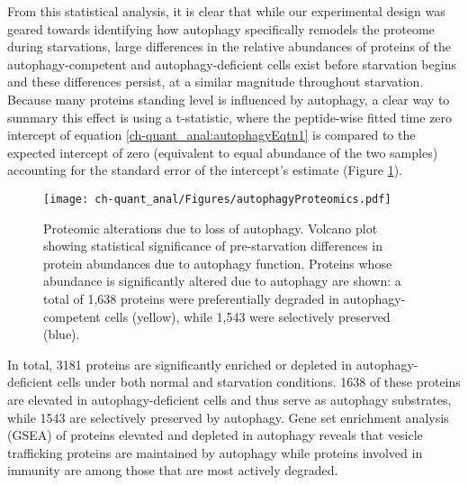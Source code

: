 From this statistical analysis, it is clear that while our experimental design was geared towards identifying how autophagy specifically remodels the proteome during starvations, large differences in the relative abundances of proteins of the autophagy-competent and autophagy-deficient cells exist before starvation begins and these differences persist, at a similar magnitude throughout starvation.  Because many proteins standing level is influenced by autophagy, a clear way to summary this effect is using a t-statistic, where the peptide-wise fitted time zero intercept of equation \ref{ch-quant_anal:autophagyEqtn1} is compared to the expected intercept of zero (equivalent to equal abundance of the two samples) accounting for the standard error of the intercept's estimate (Figure \ref{ch-quant_anal:autophagyProteomics}).

\begin{figure}[h!]
\begin{center}
\texttt{[image: ch-quant\_anal/Figures/autophagyProteomics.pdf]}
\caption[Proteomic alterations due to loss of autophagy]{Proteomic alterations due to loss of autophagy. Volcano plot showing statistical significance of pre-starvation differences in protein abundances due to autophagy function. Proteins whose abundance is significantly altered due to autophagy are shown: a total of 1,638 proteins were preferentially degraded in autophagy-competent cells (yellow), while 1,543 were selectively preserved (blue).}
\label{ch-quant_anal:autophagyProteomics}
\end{center}
\end{figure}

In total, 3181 proteins are significantly enriched or depleted in autophagy-deficient cells under both normal and starvation conditions.  1638 of these proteins are elevated in autophagy-deficient cells and thus serve as autophagy substrates, while 1543 are selectively preserved by autophagy.  Gene set enrichment analysis (GSEA) of proteins elevated and depleted in autophagy reveals that vesicle trafficking proteins are maintained by autophagy while proteins involved in immunity are among those that are most actively degraded.


